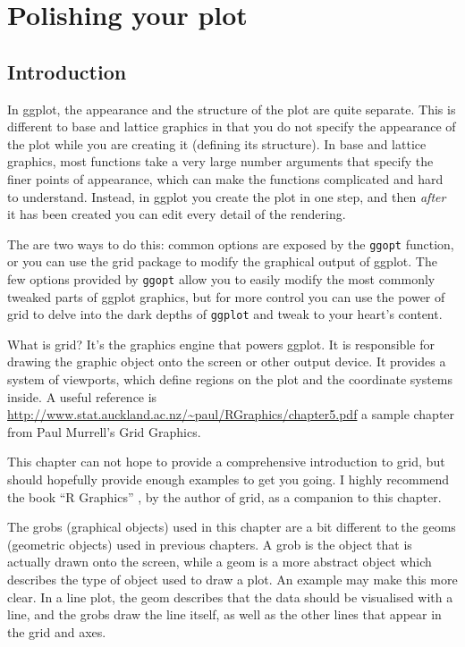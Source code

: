 

\chapter{Polishing your plot}

\section{Introduction}

In ggplot, the appearance and the structure of the plot are quite separate.  This is different to base and lattice graphics in that you do not specify the appearance of the plot while you are creating it (defining its structure).  In base and lattice graphics, most functions take a very large number arguments that specify the finer points of appearance, which can make the functions complicated and hard to understand.  Instead, in ggplot you create the plot in one step, and then {\em after} it has been created you can edit every detail of the rendering.  

The are two ways to do this: common options are exposed by the {\tt ggopt} function, or you can use the grid package to modify the graphical output of ggplot.  The few options provided by {\tt ggopt} allow you to easily modify the most commonly tweaked parts of ggplot graphics, but for more control you can use the power of grid to delve into the dark depths of {\tt ggplot} and tweak to your heart's content.

What is grid?  It's the graphics engine that powers ggplot.  It is responsible for drawing the graphic object onto the screen or other output device.  It provides a system of viewports, which define regions on the plot and the coordinate systems inside.  A useful reference is \url{http://www.stat.auckland.ac.nz/~paul/RGraphics/chapter5.pdf} a sample chapter from Paul Murrell's Grid Graphics.

This chapter can not hope to provide a comprehensive introduction to grid, but should hopefully provide enough examples to get you going.   I highly recommend the book ``R Graphics'' \citep{murrell:2005}, by the author of grid,  as a companion to this chapter.   

The grobs (graphical objects) used in this chapter are a bit different to the geoms (geometric objects) used in previous chapters.  A grob is the object that is actually drawn onto the screen, while a geom is a more abstract object which describes the type of object used to draw a plot.  An example may make this more clear. In a line plot, the geom describes that the data should be visualised with a line, and the grobs draw the line itself, as well as the other lines that appear in the grid and axes.



